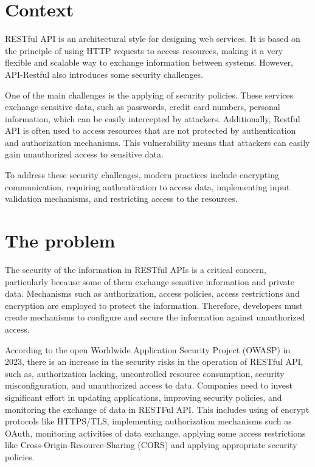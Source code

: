 \section{Context}

RESTful API is an architectural style for designing web services. It is based on the principle of using HTTP requests to access resources, making it a very flexible and scalable way to exchange information between systems. However, API-Restful also introduces some security challenges.

One of the main challenges is the applying of security policies. These services exchange sensitive data, such as passwords, credit card numbers, personal information, which can be easily intercepted by attackers. Additionally, Restful API is often used to access resources that are not protected by authentication and authorization mechanisms. This vulnerability means that attackers can easily gain unauthorized access to sensitive data.

To address these security challenges, modern practices include encrypting communication, requiring authentication to access data, implementing input validation mechanisms, and restricting access to the resources.

\section{The problem}

The security of the information in RESTful APIs is a critical concern, particularly because some of them exchange sensitive information and private data. Mechanisms such as authorization, access policies, access restrictions and encryption are employed to protect the information. Therefore, developers must create mechanisms to configure and secure the information against unauthorized access.

According to the open Worldwide Application Security Project (OWASP) in 2023, there is an increase in the security risks in the operation of RESTful API, such as, authorization lacking, uncontrolled resource consumption, security misconfiguration, and unauthorized access to data. Companies need to invest significant effort in updating applications, improving security policies, and monitoring the exchange of data in RESTFul API. This includes using of encrypt protocols like HTTPS/TLS, implementing authorization mechanisms such as OAuth, monitoring activities of data exchange, applying some access restrictions like Cross-Origin-Resource-Sharing (CORS) and applying appropriate security policies\cite{Riggs2023}.

